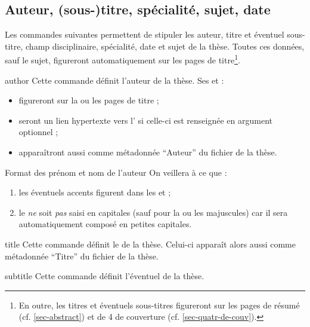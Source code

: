 \subsection{Auteur, (sous-)titre, spécialité, sujet,
  date}\label{sec-caracteristiques}

Les commandes suivantes permettent de stipuler les auteur, titre et éventuel
sous-titre, champ disciplinaire, spécialité, date et sujet de la thèse. Toutes
ces données, sauf le sujet, figureront automatiquement sur les pages de
titre\footnote{En outre, les titres et éventuels sous-titres figureront sur les
  pages de résumé (cf. \vref{sec-abstract}) et de 4\ieme{} de couverture (cf.
  \vref{sec-quatr-de-couv}).}.
%
\begin{docCommand}[doc description=\mandatory]{author}{}
  Cette commande définit l'auteur de la thèse. Ses  et
   :
  \begin{itemize}
  \item figureront sur la ou les pages de titre ;
  \item seront un lien hypertexte vers l' si celle-ci
    est renseignée en argument optionnel ;
  \item apparaîtront aussi comme métadonnée \enquote{Auteur} du
    fichier \pdf de la thèse.
  \end{itemize}
  \begin{dbwarning}{Format des prénom et nom de l'auteur}{}
    On veillera à ce que :
    \begin{enumerate}
    \item les éventuels accents figurent dans les  et
      ;
    \item le  \emph{ne} soit \emph{pas} saisi en capitales
      (sauf pour la ou les majuscules) car il sera automatiquement
      composé en petites capitales.
    \end{enumerate}
  \end{dbwarning}
\end{docCommand}
%
\begin{docCommand}[doc description=\mandatory]{title}{}
  Cette commande définit le  de la thèse. Celui-ci apparaît alors
  aussi comme métadonnée \enquote{Titre} du fichier \pdf de la thèse.
\end{docCommand}
%
\begin{docCommand}{subtitle}{}
  Cette commande définit l'éventuel  de la thèse.
\end{docCommand}
